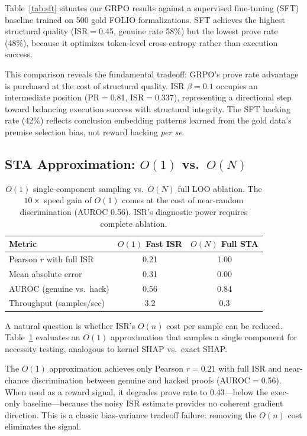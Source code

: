 \documentclass[11pt,a4paper]{article}
\begin{document}
Table~\ref{tab:sft} situates our GRPO results against a supervised fine-tuning (SFT) baseline trained on 500 gold FOLIO formalizations.
SFT achieves the highest structural quality (ISR$=$0.45, genuine rate 58\%) but the lowest prove rate (48\%), because it optimizes token-level cross-entropy rather than execution success.

This comparison reveals the fundamental tradeoff: GRPO's prove rate advantage is purchased at the cost of structural quality.
ISR $\beta{=}0.1$ occupies an intermediate position (PR$=$0.81, ISR$=$0.337), representing a directional step toward balancing execution success with structural integrity.
The SFT hacking rate (42\%) reflects conclusion embedding patterns learned from the gold data's premise selection bias, not reward hacking \textit{per se}.

\subsection{STA Approximation: $O(1)$ vs.\ $O(N)$}
\label{sec:sta-approx}

\begin{table}[t]
\centering
\small
\begin{tabular}{lcc}
\toprule
\textbf{Metric} & \textbf{$O(1)$ Fast ISR} & \textbf{$O(N)$ Full STA} \\
\midrule
Pearson $r$ with full ISR & 0.21 & 1.00 \\
Mean absolute error & 0.31 & 0.00 \\
AUROC (genuine vs.\ hack) & 0.56 & 0.84 \\
Throughput (samples/sec) & 3.2 & 0.3 \\
\bottomrule
\end{tabular}
\caption{$O(1)$ single-component sampling vs.\ $O(N)$ full LOO ablation. The $10\times$ speed gain of $O(1)$ comes at the cost of near-random discrimination (AUROC 0.56). ISR's diagnostic power requires complete ablation.}
\label{tab:approx}
\end{table}

A natural question is whether ISR's $O(n)$ cost per sample can be reduced.
Table~\ref{tab:approx} evaluates an $O(1)$ approximation that samples a single component for necessity testing, analogous to kernel SHAP vs.\ exact SHAP.

The $O(1)$ approximation achieves only Pearson $r{=}0.21$ with full ISR and near-chance discrimination between genuine and hacked proofs (AUROC$=$0.56).
When used as a reward signal, it degrades prove rate to 0.43---below the exec-only baseline---because the noisy ISR estimate provides no coherent gradient direction.
This is a classic bias-variance tradeoff failure: removing the $O(n)$ cost eliminates the signal.
\end{document}
